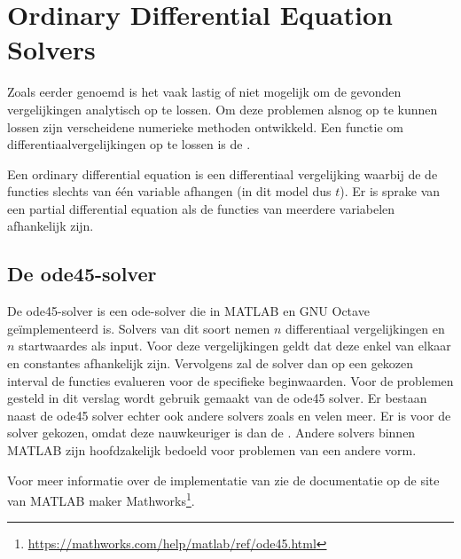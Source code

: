 \chapter{Ordinary Differential Equation Solvers}\label{sec:odeSolver}
Zoals eerder genoemd is  het vaak lastig of niet mogelijk om de gevonden vergelijkingen analytisch op te lossen. Om deze problemen alsnog op te kunnen lossen zijn verscheidene numerieke methoden ontwikkeld. Een functie om differentiaalvergelijkingen op te lossen is de .

Een ordinary differential equation is een differentiaal vergelijking waarbij de de functies slechts van \'e\'en variable afhangen (in dit model dus \(t\)). Er is sprake van een partial differential equation als de functies van meerdere variabelen afhankelijk zijn.

\section{De ode45-solver}
De ode45-solver is een ode-solver die in MATLAB en GNU Octave ge\"implementeerd is. Solvers van dit soort nemen \(n\) differentiaal vergelijkingen en \(n\) startwaardes als input. Voor deze vergelijkingen geldt dat deze enkel van elkaar en constantes afhankelijk zijn. 
Vervolgens zal de solver dan op een gekozen interval de functies evalueren voor de specifieke beginwaarden. Voor de problemen gesteld in dit verslag wordt gebruik gemaakt van de ode45 solver. Er bestaan naast de ode45 solver echter ook andere solvers zoals  en velen meer. Er is voor de  solver gekozen, omdat deze nauwkeuriger is dan de . Andere solvers binnen MATLAB zijn hoofdzakelijk bedoeld voor problemen van een andere vorm.

Voor meer informatie over de implementatie van  zie de documentatie op de site van MATLAB maker Mathworks\footnote{\url{https://mathworks.com/help/matlab/ref/ode45.html}}.
